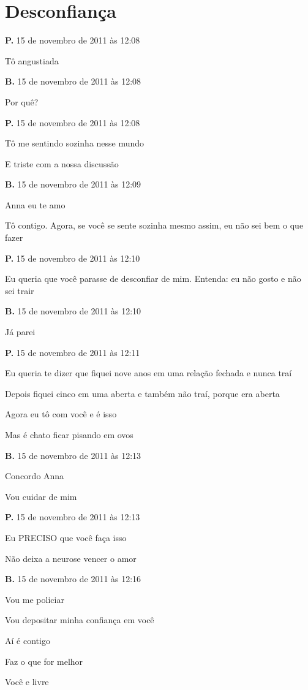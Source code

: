 \chapter{Desconfiança}

\textbf{P.} 15 de novembro de 2011 às 12:08

Tô angustiada

\textbf{B.} 15 de novembro de 2011 às 12:08

Por quê?

\textbf{P.} 15 de novembro de 2011 às 12:08

Tô me sentindo sozinha nesse mundo

E triste com a nossa discussão

\textbf{B.} 15 de novembro de 2011 às 12:09

Anna eu te amo

Tô contigo. Agora, se você se sente sozinha mesmo assim, eu não sei bem
o que fazer

\textbf{P.} 15 de novembro de 2011 às 12:10

Eu queria que você parasse de desconfiar de mim. Entenda: eu não gosto e
não sei trair

\textbf{B.} 15 de novembro de 2011 às 12:10

Já parei

\textbf{P.} 15 de novembro de 2011 às 12:11

Eu queria te dizer que fiquei nove anos em uma relação fechada e nunca
traí

Depois fiquei cinco em uma aberta e também não traí, porque era aberta

Agora eu tô com você e é isso

Mas é chato ficar pisando em ovos

\textbf{B.} 15 de novembro de 2011 às 12:13

Concordo Anna

Vou cuidar de mim

\textbf{P.} 15 de novembro de 2011 às 12:13

Eu PRECISO que você faça isso

Não deixa a neurose vencer o amor

\textbf{B.} 15 de novembro de 2011 às 12:16

Vou me policiar

Vou depositar minha confiança em você

Aí é contigo

Faz o que for melhor

Você e livre


